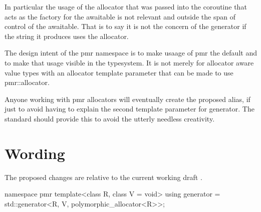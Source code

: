 \documentclass[a4paper,10pt,oneside,openany,final,article]{memoir}
\begin{document}
In particular the usage of the allocator that was passed into the coroutine that acts as the factory for the awaitable is not relevant and outside the span of control of the awaitable. That is to say it is not the concern of the generator if the string it produces uses the allocator.

The design intent of the pmr namespace is to make usaage of pmr the default and to make that usage visible in the typesystem. It is not merely for allocator aware value types with an allocator template parameter that can be made to use pmr::allocator.

Anyone working with pmr allocators will eventually create the proposed alias, if just to avoid having to explain the second template parameter for generator. The standard should provide this to avoid the utterly needless creativity.

\chapter{Wording}

The proposed changes are relative to the current working draft \cite{N4917}.

\begin{wording}

  \begin{codeblock}
    namespace std {
      // \ref{coro.generator.class}, class template 
      template<class Ref, class V = void, class Allocator = void>
      class generator;
    \end{codeblock}


    \begin{addedblock}
    \begin{codeblock}
      namespace pmr {
        template<class R, class V = void>
        using generator = std::generator<R, V, polymorphic_allocator<R>>;
      }
    \end{codeblock}
    \end{addedblock}

    \begin{codeblock}
    }
  \end{codeblock}

\end{wording}

\renewcommand{\bibname}{References}


\end{document}
